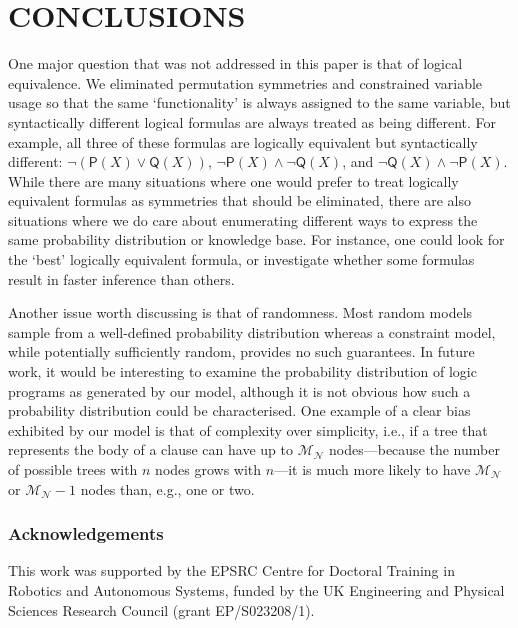\documentclass[letterpaper]{article}
\theoremstyle{definition}
\newcommand{\maxNumNodes}{\mathcal{M}_{\mathcal{N}}}
\begin{document}

\section{CONCLUSIONS}


One major question that was not addressed in this paper is that of logical
equivalence. We eliminated permutation symmetries and constrained variable usage
so that the same `functionality' is always assigned to the same variable, but
syntactically different logical formulas are always treated as being different.
For example, all three of these formulas are logically equivalent but
syntactically different: $\neg(\mathsf{P}(X) \lor \mathsf{Q}(X))$,
$\neg\mathsf{P}(X) \land \neg\mathsf{Q}(X)$, and $\neg\mathsf{Q}(X) \land
\neg\mathsf{P}(X)$. While there are many situations where one would prefer to
treat logically equivalent formulas as symmetries that should be eliminated,
there are also situations where we do care about enumerating different ways to
express the same probability distribution or knowledge base. For instance,
one could look for the `best' logically equivalent formula, or investigate
whether some formulas result in faster inference than others.

Another issue worth discussing is that of randomness. Most random models sample
from a well-defined probability distribution whereas a constraint model, while
potentially sufficiently random, provides no such guarantees. In future work, it
would be interesting to examine the probability distribution of logic programs
as generated by our model, although it is not obvious how such a
probability distribution could be characterised. One example of a clear bias
exhibited by our model is that of complexity over simplicity, i.e., if a tree
that represents the body of a clause can have up to $\maxNumNodes{}$
nodes---because the number of possible trees with $n$ nodes grows with $n$---it
is much more likely to have $\maxNumNodes{}$ or $\maxNumNodes{} - 1$ nodes than,
e.g., one or two.

\subsubsection*{Acknowledgements}

This work was supported by the EPSRC Centre for Doctoral Training in Robotics
and Autonomous Systems, funded by the UK Engineering and Physical Sciences
Research Council (grant EP/S023208/1).

\renewcommand{\bibsection}{\subsubsection*{References}}

\end{document}
